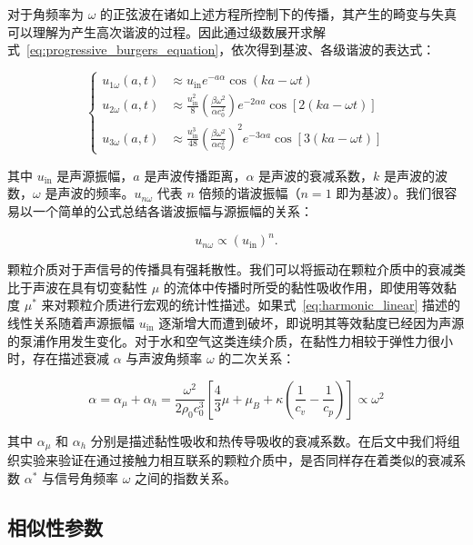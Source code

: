 对于角频率为 $\omega$ 的正弦波在诸如上述方程所控制下的传播，其产生的畸变与失真可以理解为产生高次谐波的过程。因此通过级数展开求解式~\eqref{eq:progressive_burgers_equation}，依次得到基波、各级谐波的表达式：

\begin{equation}
  \begin{cases}
    u_{1\omega}(a,t) &\approx u_{\text{in}}e^{-a\alpha}\cos{(ka-\omega t)}\\
    u_{2\omega}(a,t) &\approx \frac{u_{\text{in}}^{2}}{8}\left(\frac{\beta\omega^{2}}{\alpha c_{0}^{2}}\right)e^{-2\alpha a}\cos{[2(ka-\omega t)]}\\
    u_{3\omega}(a,t) &\approx \frac{u_{\text{in}}^{3}}{48}\left(\frac{\beta\omega^{2}}{\alpha c_{0}^{2}}\right)^{2}e^{-3\alpha a}\cos{[3(ka-\omega t)]}
    \end{cases}
\end{equation}

其中 $u_{\text{in}}$ 是声源振幅，$a$ 是声波传播距离，$\alpha$ 是声波的衰减系数，$k$ 是声波的波数，$\omega$ 是声波的频率。$u_{n\omega}$ 代表 $n$ 倍频的谐波振幅（$n=1$ 即为基波）。我们很容易以一个简单的公式总结各谐波振幅与源振幅的关系：

\begin{equation}
  u_{n\omega} \propto \left(u_{\text{in}}\right)^{n}.\label{eq:harmonic_linear}
\end{equation}

颗粒介质对于声信号的传播具有强耗散性。我们可以将振动在颗粒介质中的衰减类比于声波在具有切变黏性 $\mu$ 的流体中传播时所受的黏性吸收作用，即使用等效黏度 $\mu^{*}$ 来对颗粒介质进行宏观的统计性描述。如果式~\eqref{eq:harmonic_linear} 描述的线性关系随着声源振幅 $u_{\text{in}}$ 逐渐增大而遭到破坏，即说明其等效黏度已经因为声源的泵浦作用发生变化。对于水和空气这类连续介质，在黏性力相较于弹性力很小时，存在描述衰减 $\alpha$ 与声波角频率 $\omega$ 的二次关系：

\begin{equation}
  \alpha = \alpha_{\mu} + \alpha_{h} = \frac{\omega^{2}}{2\rho_{0}c_{0}^{3}}\left[\frac{4}{3}\mu + \mu_{B} + \kappa\left(\frac{1}{c_{v}} - \frac{1}{c_{p}}\right)\right]\propto \omega^{2}
\end{equation}

其中 $\alpha_{\mu}$ 和 $\alpha_{h}$ 分别是描述黏性吸收和热传导吸收的衰减系数。在后文中我们将组织实验来验证在通过接触力相互联系的颗粒介质中，是否同样存在着类似的衰减系数 $\alpha^{*}$ 与信号角频率 $\omega$ 之间的指数关系。

\subsection{相似性参数}

